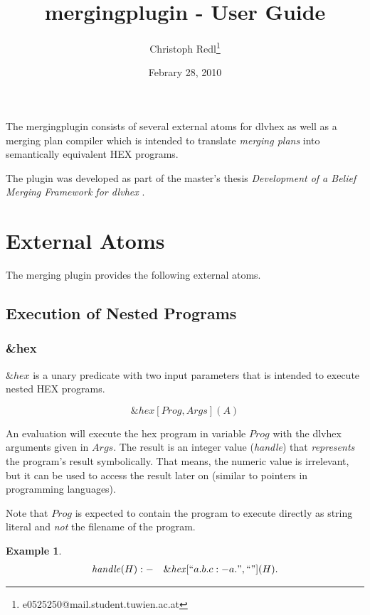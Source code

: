 \documentclass[a4paper,11pt]{article}
\theoremstyle{definition}
\newtheorem{example}{Example}
\newenvironment{mathprogram}[1][P]
	{
		\renewcommand{\ruleimplication}{&:-&}
		\newcommand{\ruledelimiter}{1}
		\begin{eqnarray*}
	}
	{
		\end{eqnarray*}
	}
\newcommand{\ruleimplication}{\ensuremath{\mathit{:-}}}
\newcommand{\hex}{\textsf{HEX}\xspace }
\newcommand{\dlvhex}{\textsf{dlvhex}\xspace }
\begin{document}
	\title{mergingplugin - User Guide}
	\date{Febrary 28, 2010}
	\author{Christoph Redl\footnote{e0525250@mail.student.tuwien.ac.at}}
	\maketitle

	The mergingplugin consists of several external atoms for \dlvhex as well as a merging plan compiler which is intended to translate \emph{merging plans} into semantically equivalent
	\hex programs.
	
	The plugin was developed as part of the master's thesis \emph{Development of a Belief Merging Framework for \dlvhex} \cite{CR10BMF}.

	
	\section{External Atoms}
	\label{sec:ExternalAtoms}

	The merging plugin provides the following external atoms.


		\subsection{Execution of Nested Programs}
		\label{sec:ExternalAtoms:Execution}


			\subsubsection{\&hex}

				$\mathit{\&hex}$ is a unary predicate with two input parameters that is intended to execute nested \hex programs.
			
					$$\mathit{\&hex}[\mathit{Prog}, \mathit{Args}](A)$$

				An evaluation will execute the hex program in variable $\mathit{Prog}$ with the \dlvhex arguments given in $\mathit{Args}$. The result is an integer value (\emph{handle})
				that \emph{represents} the program's result symbolically. That means, the numeric value is irrelevant, but it can be used to access the result later on (similar to
				pointers in programming languages).
				
				Note that $\mathit{Prog}$ is expected to contain the program to execute directly as string literal and \emph{not} the filename of the program.
				
				\begin{example}
					\label{ex:Calling1}
					\begin{mathprogram}
\mathit{handle}(H) \ruleimplication \mathit{\&hex}[``a. b. c :- a.", ``"](H).
					\end{mathprogram}
				\end{example}
\end{document}
